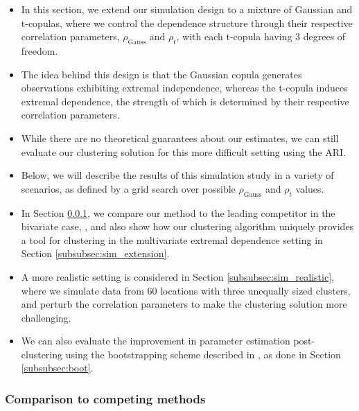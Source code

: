 \documentclass{article}
\numberwithin{equation}{section}
\begin{document}
\begin{itemize}
  \item In this section, we extend our simulation design to a mixture of Gaussian and t-copulas, where we control the dependence structure through their respective correlation parameters, $\rho_{\text{Gauss}}$ and $\rho_{t}$, with each t-copula having 3 degrees of freedom.
  \item The idea behind this design is that the Gaussian copula generates observations exhibiting extremal independence, whereas the t-copula induces extremal dependence, the strength of which is determined by their respective correlation parameters.
  \item While there are no theoretical guarantees about our estimates, we can still evaluate our clustering solution for this more difficult setting using the ARI.
  \item Below, we will describe the results of this simulation study in a variety of scenarios, as defined by a grid search over possible $\rho_{\text{Gauss}}$ and $\rho_{t}$ values. 
  \item In Section \ref{subsubsec:sim_competing_methods}, we compare our method to the leading competitor in the bivariate case, \cite{Vignotto2021}, and also show how our clustering algorithm uniquely provides a tool for clustering in the multivariate extremal dependence setting in  Section \ref{subsubsec:sim_extension}.
  \item A more realistic setting is considered in Section \ref{subsubsec:sim_realistic}, where we simulate data from 60 locations with three unequally sized clusters, and perturb the correlation parameters to make the clustering solution more challenging.
  \item We can also evaluate the improvement in parameter estimation post-clustering using the bootstrapping scheme described in \cite{Heffernan2004}, as done in Section \ref{subsubsec:boot}.
\end{itemize}

\subsubsection{Comparison to competing methods} \label{subsubsec:sim_competing_methods}
\end{document}
